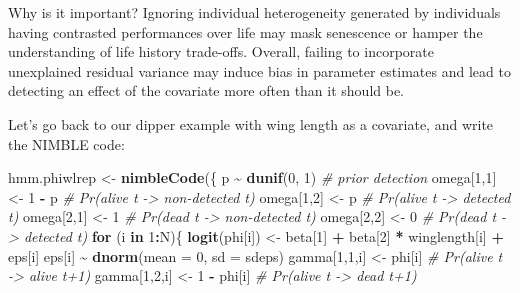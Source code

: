 \documentclass[
  12pt,
]{krantz}
\newenvironment{Shaded}{\begin{snugshade}}{\end{snugshade}}
\newcommand{\AttributeTok}[1]{\textcolor[rgb]{0.13,0.29,0.53}{#1}}
\newcommand{\CommentTok}[1]{\textcolor[rgb]{0.56,0.35,0.01}{\textit{#1}}}
\newcommand{\ControlFlowTok}[1]{\textcolor[rgb]{0.13,0.29,0.53}{\textbf{#1}}}
\newcommand{\DecValTok}[1]{\textcolor[rgb]{0.00,0.00,0.81}{#1}}
\newcommand{\FunctionTok}[1]{\textcolor[rgb]{0.13,0.29,0.53}{\textbf{#1}}}
\newcommand{\NormalTok}[1]{#1}
\newcommand{\OtherTok}[1]{\textcolor[rgb]{0.56,0.35,0.01}{#1}}
\newcommand{\SpecialCharTok}[1]{\textcolor[rgb]{0.81,0.36,0.00}{\textbf{#1}}}
\begin{document}
Why is it important? Ignoring individual heterogeneity generated by individuals having contrasted performances over life may mask senescence or hamper the understanding of life history trade-offs. Overall, failing to incorporate unexplained residual variance may induce bias in parameter estimates and lead to detecting an effect of the covariate more often than it should be.

Let's go back to our dipper example with wing length as a covariate, and write the NIMBLE code:

\begin{Shaded}
\begin{Highlighting}[]
\NormalTok{hmm.phiwlrep }\OtherTok{\textless{}{-}} \FunctionTok{nimbleCode}\NormalTok{(\{}
\NormalTok{    p }\SpecialCharTok{\textasciitilde{}} \FunctionTok{dunif}\NormalTok{(}\DecValTok{0}\NormalTok{, }\DecValTok{1}\NormalTok{) }\CommentTok{\# prior detection}
\NormalTok{    omega[}\DecValTok{1}\NormalTok{,}\DecValTok{1}\NormalTok{] }\OtherTok{\textless{}{-}} \DecValTok{1} \SpecialCharTok{{-}}\NormalTok{ p    }\CommentTok{\# Pr(alive t {-}\textgreater{} non{-}detected t)}
\NormalTok{    omega[}\DecValTok{1}\NormalTok{,}\DecValTok{2}\NormalTok{] }\OtherTok{\textless{}{-}}\NormalTok{ p        }\CommentTok{\# Pr(alive t {-}\textgreater{} detected t)}
\NormalTok{    omega[}\DecValTok{2}\NormalTok{,}\DecValTok{1}\NormalTok{] }\OtherTok{\textless{}{-}} \DecValTok{1}        \CommentTok{\# Pr(dead t {-}\textgreater{} non{-}detected t)}
\NormalTok{    omega[}\DecValTok{2}\NormalTok{,}\DecValTok{2}\NormalTok{] }\OtherTok{\textless{}{-}} \DecValTok{0}        \CommentTok{\# Pr(dead t {-}\textgreater{} detected t)}
  \ControlFlowTok{for}\NormalTok{ (i }\ControlFlowTok{in} \DecValTok{1}\SpecialCharTok{:}\NormalTok{N)\{}
    \FunctionTok{logit}\NormalTok{(phi[i]) }\OtherTok{\textless{}{-}}\NormalTok{ beta[}\DecValTok{1}\NormalTok{] }\SpecialCharTok{+}\NormalTok{ beta[}\DecValTok{2}\NormalTok{] }\SpecialCharTok{*}\NormalTok{ winglength[i] }\SpecialCharTok{+}\NormalTok{ eps[i]}
\NormalTok{    eps[i] }\SpecialCharTok{\textasciitilde{}} \FunctionTok{dnorm}\NormalTok{(}\AttributeTok{mean =} \DecValTok{0}\NormalTok{, }\AttributeTok{sd =}\NormalTok{ sdeps)}
\NormalTok{    gamma[}\DecValTok{1}\NormalTok{,}\DecValTok{1}\NormalTok{,i] }\OtherTok{\textless{}{-}}\NormalTok{ phi[i]      }\CommentTok{\# Pr(alive t {-}\textgreater{} alive t+1)}
\NormalTok{    gamma[}\DecValTok{1}\NormalTok{,}\DecValTok{2}\NormalTok{,i] }\OtherTok{\textless{}{-}} \DecValTok{1} \SpecialCharTok{{-}}\NormalTok{ phi[i]  }\CommentTok{\# Pr(alive t {-}\textgreater{} dead t+1)}

\end{Highlighting}
\end{Shaded}
\end{document}
